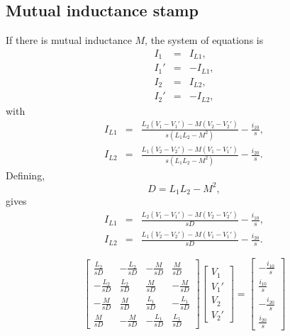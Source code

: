 \documentclass[a4paper, 12pt]{article}
\newcommand{\encp}[1]{\left(#1\right)}
\begin{document}
\subsection{Mutual inductance stamp}

If there is mutual inductance $M$, the system of equations is
%
\begin{eqnarray}
  I_1 & = & I_{L1}, \\
  I_1' & = & -I_{L1}, \\
  I_2 & = & I_{L2}, \\
  I_2' & = & -I_{L2},
\end{eqnarray}
%
with
%
\begin{eqnarray}
  I_{L1} & = & \frac{L_2\encp{V_1 - V_1'} - M\encp{V_2 - V_2'}}{s\encp{L_1 L_2 - M^2}} - \frac{i_{10}}{s}, \\
  I_{L2} & = & \frac{L_1\encp{V_2 - V_2'} - M\encp{V_1 - V_1'}}{s\encp{L_1 L_2 - M^2}} - \frac{i_{20}}{s}.
\end{eqnarray}
%
Defining,
%
\begin{equation}
  D  = L_1 L_2 - M^2,
\end{equation}
%
gives
%
\begin{eqnarray}
  I_{L1} & = & \frac{L_2\encp{V_1 - V_1'} - M\encp{V_2 - V_2'}}{sD} - \frac{i_{10}}{s}, \\
  I_{L2} & = & \frac{L_1\encp{V_2 - V_2'} - M\encp{V_1 - V_1'}}{sD} - \frac{i_{20}}{s}.
\end{eqnarray}
%

\begin{equation}
  \begin{bmatrix}
    \frac{L_2}{sD} & -\frac{L_2}{sD} & -\frac{M}{sD}  & \frac{M}{sD} \\
   -\frac{L_2}{sD} & \frac{L_2}{sD}  & \frac{M}{sD}  & -\frac{M}{sD} \\
  -\frac{M}{sD} & \frac{M}{sD} &  \frac{L_1}{sD} & -\frac{L_1}{sD}   \\
   \frac{M}{sD} & -\frac{M}{sD} & -\frac{L_1}{sD} & \frac{L_1}{sD}
  \end{bmatrix}
  \begin{bmatrix}
    V_1 \\ V_1' \\ V_2 \\ V_2'
  \end{bmatrix}
=
\begin{bmatrix}
  -\frac{i_{10}}{s} \\ \frac{i_{10}}{s} \\
  -\frac{i_{20}}{s} \\ \frac{i_{20}}{s}
\end{bmatrix}
\label{eqn:mutual_stamp1}
\end{equation}
\end{document}
